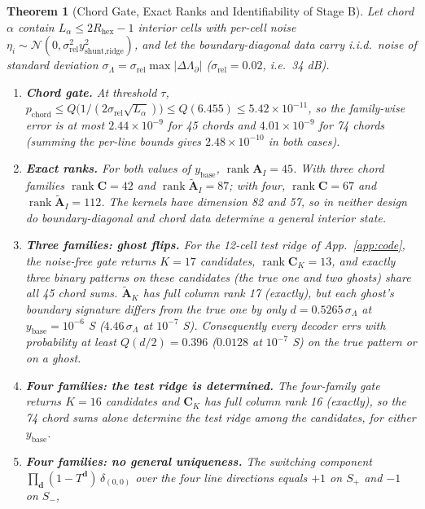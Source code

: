\documentclass[11pt,a4paper]{article}
\newtheorem{theorem}{Theorem}[section]
\theoremstyle{definition}
\theoremstyle{remark}
\begin{document}
\begin{theorem}[Chord Gate, Exact Ranks and Identifiability of Stage B]\label{thm:ghost}
Let chord $\alpha$ contain $L_\alpha\le 2R_{\text{hex}}-1$ interior cells with per-cell noise $\eta_i \sim \mathcal{N}(0,\sigma_{\text{rel}}^2 y_{\text{shunt,ridge}}^2)$, and let the boundary-diagonal data carry i.i.d.\ noise of standard deviation $\sigma_\Lambda = \sigma_{\text{rel}}\max|\Delta\Lambda_\partial|$ ($\sigma_{\text{rel}} = 0.02$, i.e.\ 34 dB).
\begin{enumerate}
\item \textbf{Chord gate.} At threshold $\tau$, $p_{\text{chord}}\le Q\big(1/(2\sigma_{\text{rel}}\sqrt{L_\alpha})\big) \le Q(6.455) \le 5.42\times 10^{-11}$, so the family-wise error is at most $2.44\times 10^{-9}$ for 45 chords and $4.01\times 10^{-9}$ for 74 chords (summing the per-line bounds gives $2.48\times10^{-10}$ in both cases).
\item \textbf{Exact ranks.} For both values of $y_{\text{base}}$, $\operatorname{rank}\mathbf{A}_I = 45$. With three chord families $\operatorname{rank}\mathbf{C} = 42$ and $\operatorname{rank}\widetilde{\mathbf{A}}_I = 87$; with four, $\operatorname{rank}\mathbf{C} = 67$ and $\operatorname{rank}\widetilde{\mathbf{A}}_I = 112$. The kernels have dimension 82 and 57, so in neither design do boundary-diagonal and chord data determine a general interior state.
\item \textbf{Three families: ghost flips.} For the 12-cell test ridge of App.~\ref{app:code}, the noise-free gate returns $K=17$ candidates, $\operatorname{rank}\mathbf{C}_K = 13$, and exactly three binary patterns on these candidates (the true one and two ghosts) share all 45 chord sums. $\widetilde{\mathbf{A}}_K$ has full column rank 17 (exactly), but each ghost's boundary signature differs from the true one by only $d = 0.5265\,\sigma_\Lambda$ at $y_{\text{base}} = 10^{-6}$ S ($4.46\,\sigma_\Lambda$ at $10^{-7}$ S). Consequently every decoder errs with probability at least $Q(d/2) = 0.396$ ($0.0128$ at $10^{-7}$ S) on the true pattern or on a ghost.
\item \textbf{Four families: the test ridge is determined.} The four-family gate returns $K = 16$ candidates and $\mathbf{C}_K$ has full column rank 16 (exactly), so the 74 chord sums alone determine the test ridge among the candidates, for either $y_{\text{base}}$.
\item \textbf{Four families: no general uniqueness.} The switching component $\prod_{\mathbf{d}}(1-T^{\mathbf{d}})\,\delta_{(0,0)}$ over the four line directions equals $+1$ on $S_+$ and $-1$ on $S_-$,

\end{enumerate}
\end{theorem}
\end{document}
